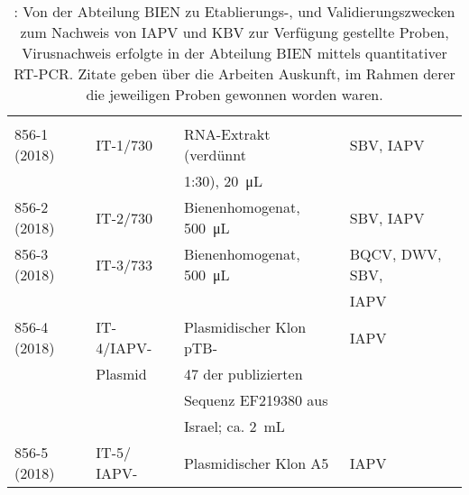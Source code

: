 \begin{table}[H]
    \centering
    \caption{: Von der Abteilung BIEN zu Etablierungs-, und Validierungszwecken zum Nachweis von IAPV und KBV zur Verfügung gestellte Proben, Virusnachweis erfolgte in der Abteilung BIEN mittels quantitativer RT-PCR. Zitate geben über die Arbeiten Auskunft, im Rahmen derer die jeweiligen Proben gewonnen worden waren.}
    \label{tab:e:validierung}
    \begin{tabular}{*{4}{l}}
        \toprule
         &
         &
         &
         \\
        &&& \\
        \midrule
        856-1 (2018)    & IT-1/730              & RNA-Extrakt (verdünnt     & SBV, IAPV\\ 
                        &                       & 1:30), \SI{20}{\micro\liter}  &\\
        856-2 (2018)    & IT-2/730              & Bienenhomogenat, \SI{500}{\micro\liter} & SBV, IAPV\\ 
        856-3 (2018)    & IT-3/733              & Bienenhomogenat, \SI{500}{\micro\liter} & BQCV, DWV, SBV,\\
                        &                       &                           & IAPV\\
        856-4 (2018)    & IT-4/IAPV-            & Plasmidischer Klon pTB-   & IAPV\\
                        & Plasmid               & 47 der publizierten       &\\
                        &                       & Sequenz EF219380 aus      &\\
                        &                        & Israel; ca. \SI{2}{\milli\liter} &\\
        856-5 (2018)    & IT-5/ IAPV-           & Plasmidischer Klon A5     & IAPV\\

\end{tabular}
\end{table}
